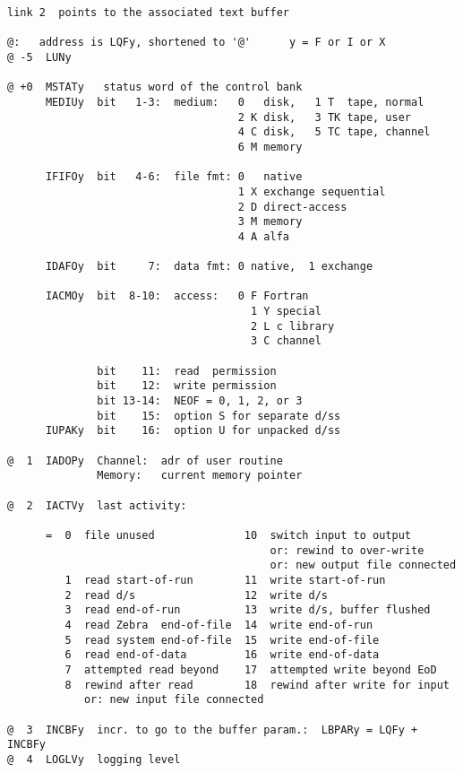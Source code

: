 \begin{verbatim}
link 2  points to the associated text buffer

@:   address is LQFy, shortened to '@'      y = F or I or X
@ -5  LUNy

@ +0  MSTATy   status word of the control bank
      MEDIUy  bit   1-3:  medium:   0   disk,   1 T  tape, normal
                                    2 K disk,   3 TK tape, user
                                    4 C disk,   5 TC tape, channel
                                    6 M memory

      IFIFOy  bit   4-6:  file fmt: 0   native
                                    1 X exchange sequential
                                    2 D direct-access
                                    3 M memory
                                    4 A alfa

      IDAFOy  bit     7:  data fmt: 0 native,  1 exchange

      IACMOy  bit  8-10:  access:   0 F Fortran
                                      1 Y special
                                      2 L c library
                                      3 C channel

              bit    11:  read  permission
              bit    12:  write permission
              bit 13-14:  NEOF = 0, 1, 2, or 3
              bit    15:  option S for separate d/ss
      IUPAKy  bit    16:  option U for unpacked d/ss

@  1  IADOPy  Channel:  adr of user routine
              Memory:   current memory pointer

@  2  IACTVy  last activity:

      =  0  file unused              10  switch input to output
                                         or: rewind to over-write
                                         or: new output file connected
         1  read start-of-run        11  write start-of-run
         2  read d/s                 12  write d/s
         3  read end-of-run          13  write d/s, buffer flushed
         4  read Zebra  end-of-file  14  write end-of-run
         5  read system end-of-file  15  write end-of-file
         6  read end-of-data         16  write end-of-data
         7  attempted read beyond    17  attempted write beyond EoD
         8  rewind after read        18  rewind after write for input
            or: new input file connected

@  3  INCBFy  incr. to go to the buffer param.:  LBPARy = LQFy + INCBFy
@  4  LOGLVy  logging level


\end{verbatim}
